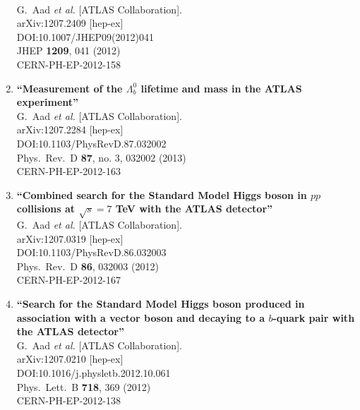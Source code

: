 \documentclass{article}
\begin{document}
\begin{enumerate}
  \\{}G.~Aad {\it et al.} [ATLAS Collaboration].
  \\{}arXiv:1207.2409 [hep-ex]
  \\{}DOI:10.1007/JHEP09(2012)041
  \\{}JHEP {\bf 1209}, 041 (2012)
  \\{}CERN-PH-EP-2012-158
\item%
{\bf ``Measurement of the $Λ_b^0$ lifetime and mass in the ATLAS experiment''}
  \\{}G.~Aad {\it et al.} [ATLAS Collaboration].
  \\{}arXiv:1207.2284 [hep-ex]
  \\{}DOI:10.1103/PhysRevD.87.032002
  \\{}Phys.\ Rev.\ D {\bf 87}, no. 3, 032002 (2013)
  \\{}CERN-PH-EP-2012-163
\item%
{\bf ``Combined search for the Standard Model Higgs boson in $pp$ collisions at $\sqrt{s} = 7$ TeV with the ATLAS detector''}
  \\{}G.~Aad {\it et al.} [ATLAS Collaboration].
  \\{}arXiv:1207.0319 [hep-ex]
  \\{}DOI:10.1103/PhysRevD.86.032003
  \\{}Phys.\ Rev.\ D {\bf 86}, 032003 (2012)
  \\{}CERN-PH-EP-2012-167
\item%
{\bf ``Search for the Standard Model Higgs boson produced in association with a vector boson and decaying to a $b$-quark pair with the ATLAS detector''}
  \\{}G.~Aad {\it et al.} [ATLAS Collaboration].
  \\{}arXiv:1207.0210 [hep-ex]
  \\{}DOI:10.1016/j.physletb.2012.10.061
  \\{}Phys.\ Lett.\ B {\bf 718}, 369 (2012)
  \\{}CERN-PH-EP-2012-138

\end{enumerate}
\end{document}
